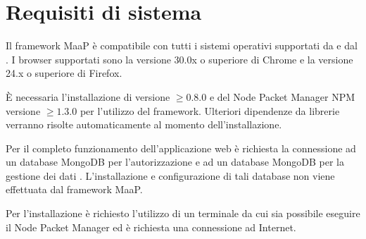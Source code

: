 \section{Requisiti di sistema}

Il framework MaaP è compatibile con tutti i sistemi operativi supportati da  e dal . I browser supportati sono la versione 30.0x o superiore di Chrome e la versione 24.x o superiore di Firefox.

È necessaria l'installazione di  versione $\geq 0.8.0$ e del Node Packet Manager NPM versione $\geq 1.3.0$ per l'utilizzo del framework. Ulteriori dipendenze da librerie verranno risolte automaticamente al momento dell'installazione.

Per il completo funzionamento dell'applicazione web è richiesta la connessione ad un database MongoDB per l'autorizzazione e ad un database MongoDB per la gestione dei dati . L'installazione e configurazione di tali database non viene effettuata dal framework MaaP.

Per l'installazione è richiesto l'utilizzo di un terminale da cui sia possibile eseguire il Node Packet Manager ed è richiesta una connessione ad Internet.

